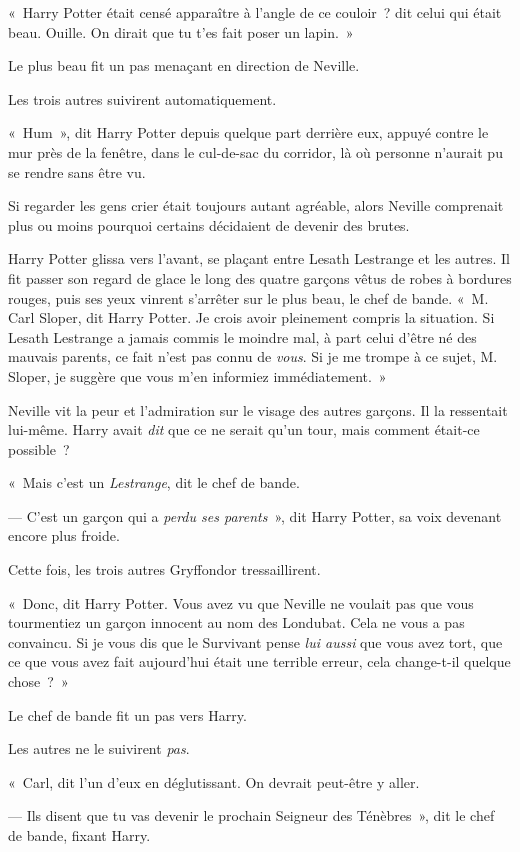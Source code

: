 «~Harry Potter était censé apparaître à l'angle de ce couloir~? dit celui qui était beau. Ouille. On dirait que tu t'es fait poser un lapin.~»

Le plus beau fit un pas menaçant en direction de Neville.

Les trois autres suivirent automatiquement.

«~Hum~», dit Harry Potter depuis quelque part derrière eux, appuyé contre le mur près de la fenêtre, dans le cul-de-sac du corridor, là où personne n'aurait pu se rendre sans être vu.

Si regarder les gens crier était toujours autant agréable, alors Neville comprenait plus ou moins pourquoi certains décidaient de devenir des brutes.

Harry Potter glissa vers l'avant, se plaçant entre Lesath Lestrange et les autres. Il fit passer son regard de glace le long des quatre garçons vêtus de robes à bordures rouges, puis ses yeux vinrent s'arrêter sur le plus beau, le chef de bande. «~M. Carl Sloper, dit Harry Potter. Je crois avoir pleinement compris la situation. Si Lesath Lestrange a jamais commis le moindre mal, à part celui d'être né des mauvais parents, ce fait n'est pas connu de \emph{vous}. Si je me trompe à ce sujet, M. Sloper, je suggère que vous m'en informiez immédiatement.~»

Neville vit la peur et l'admiration sur le visage des autres garçons. Il la ressentait lui-même. Harry avait \emph{dit} que ce ne serait qu'un tour, mais comment était-ce possible~?

«~Mais c'est un \emph{Lestrange}, dit le chef de bande.

--- C'est un garçon qui a \emph{perdu ses parents}~», dit Harry Potter, sa voix devenant encore plus froide.

Cette fois, les trois autres Gryffondor tressaillirent.

«~Donc, dit Harry Potter. Vous avez vu que Neville ne voulait pas que vous tourmentiez un garçon innocent au nom des Londubat. Cela ne vous a pas convaincu. Si je vous dis que le Survivant pense \emph{lui aussi} que vous avez tort, que ce que vous avez fait aujourd'hui était une terrible erreur, cela change-t-il quelque chose~?~»

Le chef de bande fit un pas vers Harry.

Les autres ne le suivirent \emph{pas}.

«~Carl, dit l'un d'eux en déglutissant. On devrait peut-être y aller.

--- Ils disent que tu vas devenir le prochain Seigneur des Ténèbres~», dit le chef de bande, fixant Harry.

